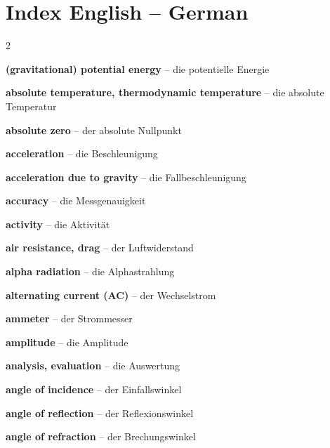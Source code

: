 \section{Index English -- German}
\begin{multicols}{2}\small\raggedright

\medskip{\large\textbf{\color{cornflower}(}}\par\nopagebreak
\textbf{(gravitational) potential energy} -- die potentielle Energie\dotfill\hyperref[e:97]{\pageref*{e:97}}\par

\par\nopagebreak
\textbf{absolute temperature, thermodynamic temperature} -- die absolute Temperatur\dotfill\hyperref[e:114]{\pageref*{e:114}}\par
\textbf{absolute zero} -- der absolute Nullpunkt\dotfill\hyperref[e:115]{\pageref*{e:115}}\par
\textbf{acceleration} -- die Beschleunigung\dotfill\hyperref[e:40]{\pageref*{e:40}}\par
\textbf{acceleration due to gravity} -- die Fallbeschleunigung\dotfill\hyperref[e:47]{\pageref*{e:47}}\par
\textbf{accuracy} -- die Messgenauigkeit\dotfill\hyperref[e:13]{\pageref*{e:13}}\par
\textbf{activity} -- die Aktivität\dotfill\hyperref[e:283]{\pageref*{e:283}}\par
\textbf{air resistance, drag} -- der Luftwiderstand\dotfill\hyperref[e:69]{\pageref*{e:69}}\par
\textbf{alpha radiation} -- die Alphastrahlung\dotfill\hyperref[e:275]{\pageref*{e:275}}\par
\textbf{alternating current (AC)} -- der Wechselstrom\dotfill\hyperref[e:167]{\pageref*{e:167}}\par
\textbf{ammeter} -- der Strommesser\dotfill\hyperref[e:160]{\pageref*{e:160}}\par
\textbf{amplitude} -- die Amplitude\dotfill\hyperref[e:195]{\pageref*{e:195}}\par
\textbf{analysis, evaluation} -- die Auswertung\dotfill\hyperref[e:19]{\pageref*{e:19}}\par
\textbf{angle of incidence} -- der Einfallswinkel\dotfill\hyperref[e:230]{\pageref*{e:230}}\par
\textbf{angle of reflection} -- der Reflexionswinkel\dotfill\hyperref[e:231]{\pageref*{e:231}}\par
\textbf{angle of refraction} -- der Brechungswinkel\dotfill\hyperref[e:235]{\pageref*{e:235}}\par

\end{multicols}
